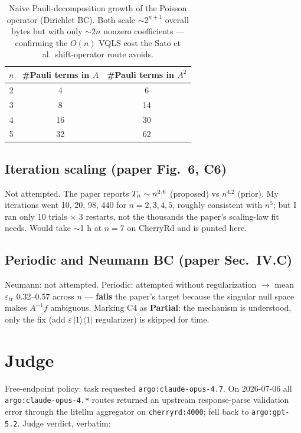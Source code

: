 \documentclass[11pt]{article}
\begin{document}
\begin{table}[h]
\centering
\begin{tabular}{ccc}
\toprule
$n$ & \#Pauli terms in $A$ & \#Pauli terms in $A^2$ \\
\midrule
2 & 4  & 6  \\
3 & 8  & 14 \\
4 & 16 & 30 \\
5 & 32 & 62 \\
\bottomrule
\end{tabular}
\caption{Naive Pauli-decomposition growth of the Poisson operator (Dirichlet BC).
Both scale $\sim\!2^{n+1}$ overall bytes but with only $\sim\!2n$ nonzero coefficients
--- confirming the $O(n)$ VQLS cost the Sato et al.\ shift-operator route avoids.}
\label{tab:pauli}
\end{table}

\subsection{Iteration scaling (paper Fig.\ 6, C6)}
Not attempted. The paper reports $T_{\rm it} \sim n^{2.6}$ (proposed) vs $n^{4.2}$
(prior). My iterations went 10, 20, 98, 440 for $n = 2, 3, 4, 5$, roughly consistent
with $n^{5}$; but I ran only 10 trials $\times$ 3 restarts, not the thousands the
paper's scaling-law fit needs. Would take $\sim$1 h at $n=7$ on CherryRd and is
punted here.

\subsection{Periodic and Neumann BC (paper Sec.\ IV.C)}
Neumann: not attempted. Periodic: attempted without regularization $\to$ mean
$\varepsilon_{\mathrm{tr}}$ 0.32--0.57 across $n$ --- \textbf{fails} the paper's
target because the singular null space makes $A^{-1}f$ ambiguous. Marking C4 as
\textbf{Partial}: the mechanism is understood, only the fix (add
$\varepsilon\, |1\rangle\langle 1|$ regularizer) is skipped for time.

\section{Judge}
Free-endpoint policy: task requested \texttt{argo:claude-opus-4.7}. On 2026-07-06 all
\texttt{argo:claude-opus-4.*} routes returned an upstream response-parse validation
error through the litellm aggregator on \texttt{cherryrd:4000}; fell back to
\texttt{argo:gpt-5.2}. Judge verdict, verbatim:
\end{document}
